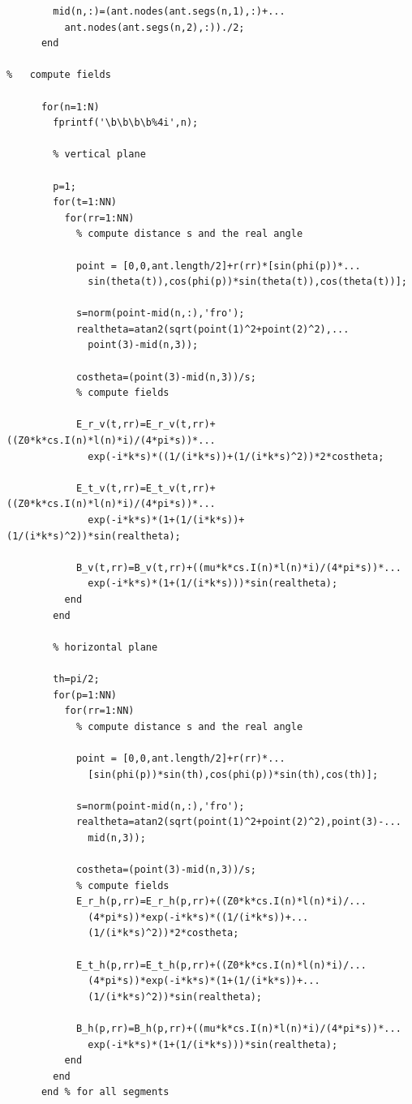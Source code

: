\documentclass[a4paper,11pt]{thesis}
\begin{document}
\begin{verbatim}
        mid(n,:)=(ant.nodes(ant.segs(n,1),:)+...
          ant.nodes(ant.segs(n,2),:))./2;
      end

%   compute fields

      for(n=1:N)
        fprintf('\b\b\b\b%4i',n);

        % vertical plane

        p=1;
        for(t=1:NN)
          for(rr=1:NN)
            % compute distance s and the real angle

            point = [0,0,ant.length/2]+r(rr)*[sin(phi(p))*...
              sin(theta(t)),cos(phi(p))*sin(theta(t)),cos(theta(t))];

            s=norm(point-mid(n,:),'fro');
            realtheta=atan2(sqrt(point(1)^2+point(2)^2),...
              point(3)-mid(n,3));

            costheta=(point(3)-mid(n,3))/s;
            % compute fields

            E_r_v(t,rr)=E_r_v(t,rr)+((Z0*k*cs.I(n)*l(n)*i)/(4*pi*s))*...
              exp(-i*k*s)*((1/(i*k*s))+(1/(i*k*s)^2))*2*costheta;

            E_t_v(t,rr)=E_t_v(t,rr)+((Z0*k*cs.I(n)*l(n)*i)/(4*pi*s))*...
              exp(-i*k*s)*(1+(1/(i*k*s))+(1/(i*k*s)^2))*sin(realtheta);

            B_v(t,rr)=B_v(t,rr)+((mu*k*cs.I(n)*l(n)*i)/(4*pi*s))*...
              exp(-i*k*s)*(1+(1/(i*k*s)))*sin(realtheta);
          end
        end

        % horizontal plane

        th=pi/2;
        for(p=1:NN)
          for(rr=1:NN)
            % compute distance s and the real angle

            point = [0,0,ant.length/2]+r(rr)*...
              [sin(phi(p))*sin(th),cos(phi(p))*sin(th),cos(th)];

            s=norm(point-mid(n,:),'fro');
            realtheta=atan2(sqrt(point(1)^2+point(2)^2),point(3)-...
              mid(n,3));

            costheta=(point(3)-mid(n,3))/s;
            % compute fields
            E_r_h(p,rr)=E_r_h(p,rr)+((Z0*k*cs.I(n)*l(n)*i)/...
              (4*pi*s))*exp(-i*k*s)*((1/(i*k*s))+...
              (1/(i*k*s)^2))*2*costheta;

            E_t_h(p,rr)=E_t_h(p,rr)+((Z0*k*cs.I(n)*l(n)*i)/...
              (4*pi*s))*exp(-i*k*s)*(1+(1/(i*k*s))+...
              (1/(i*k*s)^2))*sin(realtheta);

            B_h(p,rr)=B_h(p,rr)+((mu*k*cs.I(n)*l(n)*i)/(4*pi*s))*...
              exp(-i*k*s)*(1+(1/(i*k*s)))*sin(realtheta);
          end
        end
      end % for all segments



\end{verbatim}
\end{document}
